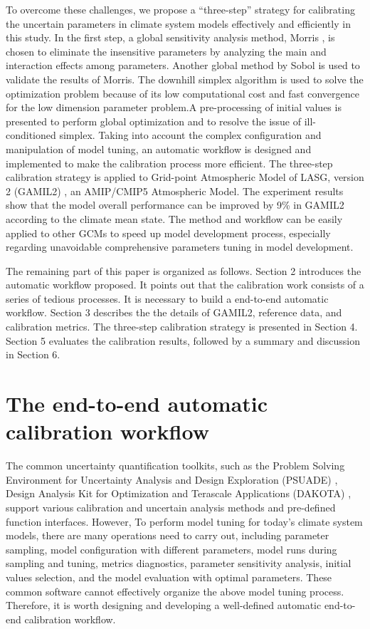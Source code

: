 \documentclass[gmd, manuscript]{copernicus}
\begin{document}
To overcome these challenges, we propose a ``three-step'' strategy for calibrating the uncertain parameters in climate system models effectively and efficiently in this study. In the first step, a global sensitivity analysis method, Morris \citep{morris1991factorial, campolongo2007effective}, is chosen to eliminate the insensitive parameters by analyzing the main and interaction effects among parameters. Another global method by Sobol \citep{sobol2001global} is used to validate the results of Morris. The downhill simplex algorithm is used to solve the optimization problem because of its low computational cost and fast convergence for the low dimension parameter problem.A pre-processing of initial values is presented to perform global optimization and to resolve the issue of ill-conditioned simplex. Taking into account the complex configuration and manipulation of model tuning, an automatic workflow is designed and implemented to make the calibration process more efficient. The three-step calibration strategy is applied to Grid-point Atmospheric Model of LASG, version 2 (GAMIL2) \citep{li2013evaluation}, an AMIP/CMIP5 Atmospheric Model. The experiment results show that the model overall performance can be improved by 9\% in GAMIL2 according to the climate mean state. The method and workflow can be easily applied to other GCMs to speed up model development process, especially regarding unavoidable comprehensive parameters tuning in model development.


The remaining part of this paper is organized as follows. Section 2 introduces the automatic workflow proposed. It points out that the calibration work consists of a series of tedious processes. It is necessary to build a end-to-end automatic workflow. Section 3 describes the the details of GAMIL2, reference data, and calibration metrics. The three-step calibration strategy is presented in Section 4. Section 5 evaluates the calibration results, followed by a summary and discussion in Section 6.   


\section{The end-to-end automatic calibration workflow}

The common uncertainty quantification toolkits, such as the Problem Solving Environment for Uncertainty Analysis and Design Exploration (PSUADE) \citep{tong2005psuade}, Design Analysis Kit for Optimization and Terascale Applications (DAKOTA) \citep{eldred2007investigation}, support various calibration and uncertain analysis methods and pre-defined function interfaces.  However, To perform model tuning for today’s climate system models, there are many operations need to carry out, including parameter sampling, model configuration with different parameters, model runs during sampling and tuning, metrics diagnostics, parameter sensitivity analysis, initial values selection, and the model evaluation with optimal parameters. These common software cannot effectively organize the above model tuning process. Therefore, it is worth designing and developing a well-defined automatic end-to-end calibration workflow. 
\end{document}
